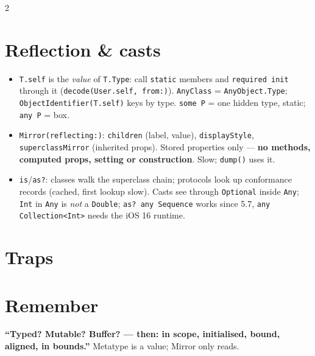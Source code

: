 \documentclass[8pt]{extarticle}
\begin{document}
\begin{multicols}{2}
\section{Reflection \& casts}
\begin{itemize}
  \item \texttt{T.self} is the \emph{value} of \texttt{T.Type}: call
        \texttt{static} members and \texttt{required init} through it
        (\texttt{decode(User.self, from:)}). \texttt{AnyClass} =
        \texttt{AnyObject.Type}; \texttt{ObjectIdentifier(T.self)} keys by type.
        \texttt{some P} = one hidden type, static; \texttt{any P} = box.
  \item \texttt{Mirror(reflecting:)}: \texttt{children} (label, value),
        \texttt{displayStyle}, \texttt{superclassMirror} (inherited props).
        Stored properties only — \textbf{no methods, computed props,
        setting or construction}. Slow; \texttt{dump()} uses it.
  \item \texttt{is}/\texttt{as?}: classes walk the superclass chain;
        protocols look up conformance records (cached, first lookup slow).
        Casts see through \texttt{Optional} inside \texttt{Any}; \texttt{Int}
        in \texttt{Any} is \emph{not} a \texttt{Double}; \texttt{as? any
        Sequence} works since 5.7, \texttt{any Collection<Int>} needs the
        iOS 16 runtime.
\end{itemize}

\section{Traps}
\begin{itemize}
\end{itemize}

\section{Remember}
\textbf{``Typed? Mutable? Buffer? — then: in scope, initialised, bound,
aligned, in bounds.''} Metatype is a value; Mirror only reads.


\end{multicols}

\end{document}
